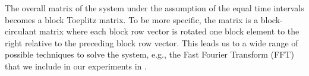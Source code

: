 The overall matrix of the system under the assumption of the equal time intervals becomes a block Toeplitz matrix. To be more specific, the matrix is a block-circulant matrix where each block row vector is rotated one block element to the right relative to the preceding block row vector. This leads us to a wide range of possible techniques to solve the system, e.g., the Fast Fourier Transform (FFT) \cite{mazancourt1983, vescovo1997} that we include in our experiments in .
